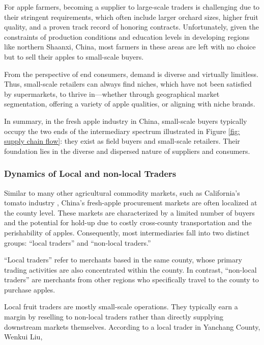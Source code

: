 For apple farmers, becoming a supplier to large-scale traders is challenging due to their stringent requirements, which often include larger orchard sizes, higher fruit quality, and a proven track record of honoring contracts. Unfortunately, given the constraints of production conditions and education levels in developing regions like northern Shaanxi, China, most farmers in these areas are left with no choice but to sell their apples to small-scale buyers.

From the perspective of end consumers, demand is diverse and virtually limitless. Thus, small-scale retailers can always find niches, which have not been satisfied by supermarkets, to thrive in—whether through geographical market segmentation, offering a variety of apple qualities, or aligning with niche brands.

In summary, in the fresh apple industry in China, small-scale buyers typically occupy the two ends of the intermediary spectrum illustrated in Figure \ref{fig: supply chain flow}: they exist as field buyers and small-scale retailers. Their foundation lies in the diverse and dispersed nature of suppliers and consumers.




\subsubsection{Dynamics of Local and non-local Traders \label{Section: intro of Local and non-local traders}}
\noindent Similar to many other agricultural commodity markets, such as California's tomato industry \citep{hamilton2024spatial}, China's fresh-apple procurement markets are often localized at the county level. These markets are characterized by a limited number of buyers and the potential for hold-up due to costly cross-county transportation and the perishability of apples. Consequently, most intermediaries fall into two distinct groups: ``local traders'' and ``non-local traders.''  

``Local traders'' refer to merchants based in the same county, whose primary trading activities are also concentrated within the county. In contrast, ``non-local traders'' are merchants from other regions who specifically travel to the county to purchase apples.  

Local fruit traders are mostly small-scale operations. They typically earn a margin by reselling to non-local traders rather than directly supplying downstream markets themselves. According to a local trader in Yanchang County, Wenkui Liu, 

